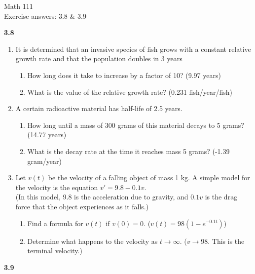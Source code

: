 \documentclass[11pt]{article}
\begin{document}
\begin{center}
\Large
\rm{Math 111}
\\
\rm{Exercise answers:  3.8 \& 3.9}
\\
\end{center}
\vspace{0.2in}


{\bf 3.8}

\begin{enumerate}
\item{It is determined that an invasive species of fish grows with a constant relative growth rate and that the population doubles in 3 years
\begin{enumerate}
\item{How long does it take to increase by a factor of 10? (9.97 years) }
\item{What is the value of the relative growth rate?  (0.231 fish/year/fish)}
\end{enumerate}
}

\item{A certain radioactive material has half-life of 2.5 years. 
\begin{enumerate}
\item{How long until a mass of 300 grams of this material decays to 5 grams?  (14.77 years)}
\item{What is the decay rate at the time it reaches mass 5 grams? (-1.39  gram/year)}
\end{enumerate}
}

\item{Let $v(t)$ be the velocity of a falling object of mass 1 kg.  A simple model for the velocity is the equation $v' = 9.8 - 0.1v$.
  \\ (In this model, 9.8 is the acceleration due to gravity, and $0.1v$ is the drag force that the object experiences as it falls.)
\begin{enumerate}
\item{Find a formula for  $v(t)$ if $v(0)=0$. ($v(t) = 98(1-e^{-0.1t})$) }
\item{Determine what happens to the velocity as $t\to\infty$.} ($v \to 98$.  This is the terminal velocity.)
\end{enumerate}

}
\end{enumerate}


{\bf 3.9}
\end{document}
